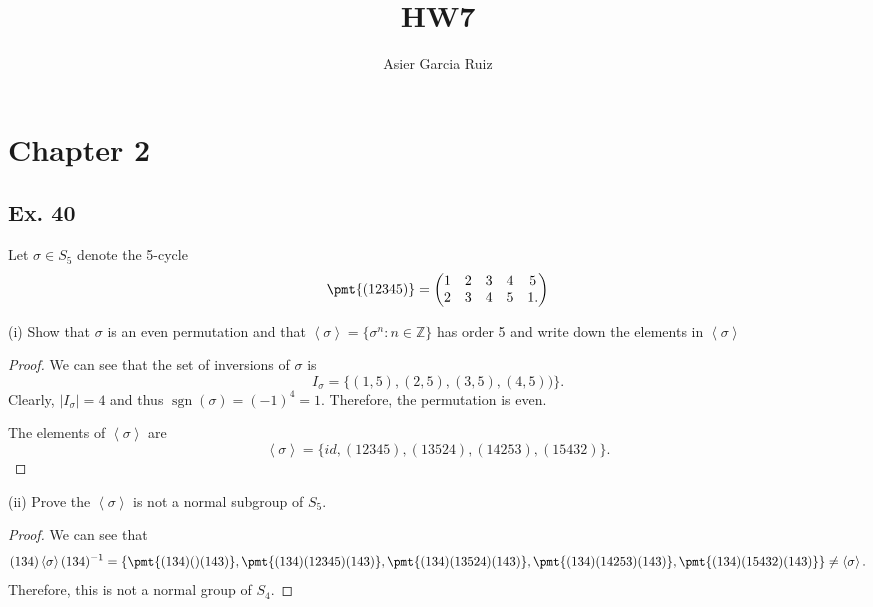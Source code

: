 \documentclass{article}
\title{HW7}
\author{Asier Garcia Ruiz}
\newcommand{\Z}{\mathbb{Z}}
\newcommand{\gen}[1]{\left\langle #1 \right\rangle}
\DeclareMathOperator*{\sgn}{sgn}
\newenvironment{hwproof}[1]
{
    #1
    \begin{proof}
}{
    \end{proof}
}
\begin{document}
\maketitle

\section*{Chapter 2}
\subsection*{Ex. 40}
\begin{hwproof}
    {
        Let $\sigma \in S_5$ denote the 5-cycle
        \begin{equation*}
            \pmt{(12345)} = \begin{pmatrix}
                1 & 2 & 3 & 4 & 5  \\
                2 & 3 & 4 & 5 & 1.
            \end{pmatrix}
        \end{equation*}

        (i) Show that $\sigma$ is an even permutation and that
        $\gen{\sigma} = \{\sigma^n : n \in \Z\}$ has order 5 and write down the
        elements in $\gen{\sigma}$

    }
    We can see that the set of inversions of $\sigma$ is
    \begin{equation*}
        I_\sigma = \{(1,5),(2,5),(3,5),(4,5))\}.
    \end{equation*}
    Clearly, $|I_\sigma| = 4$ and thus $\sgn(\sigma) = (-1)^4 = 1$. Therefore,
    the permutation is even.

    The elements of $\gen{\sigma}$ are
    \begin{equation*}
        \gen{\sigma} = \{id, (12345), (13524), (14253), (15432)\}.
    \end{equation*}
\end{hwproof}

\begin{hwproof}
    {
        (ii) Prove the $\gen{\sigma}$ is not a normal subgroup of $S_5$.
    }

    We can see that
    \begin{equation*}
        (134)\gen{\sigma}(134)^{-1} =
        \{\pmt{(134)()(143)},\pmt{(134)(12345)(143)}, \pmt{(134)(13524)(143)},
        \pmt{(134)(14253)(143)}, \pmt{(134)(15432)(143)}\} \neq \gen{\sigma}.
    \end{equation*}
    Therefore, this is not a normal group of $S_4$.
\end{hwproof}
\end{document}
